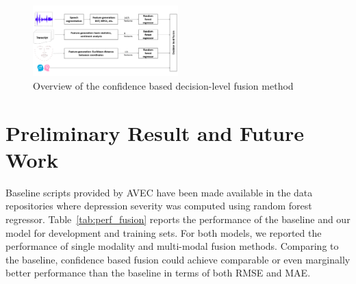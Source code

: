 \documentclass[letterpaper]{article} %
\begin{document}
\vspace{-3.47mm}
\begin{figure}[ht]
\centering
\includegraphics[width=0.5\textwidth]{framework}
\caption{Overview of the confidence based decision-level fusion method}
\label{fig:framework}
\end{figure}

\vspace{-3.15mm}
\section{Preliminary Result and Future Work }
Baseline scripts provided by AVEC have been made available in the data repositories where depression severity was computed using random forest regressor.
Table~\ref{tab:perf_fusion} reports the performance of the baseline and our model for development and training sets. For both models, we reported the performance of single modality and multi-modal fusion methods. Comparing to the baseline, confidence based fusion could achieve comparable or even marginally better performance than the baseline in terms of both RMSE and MAE.
\end{document}
